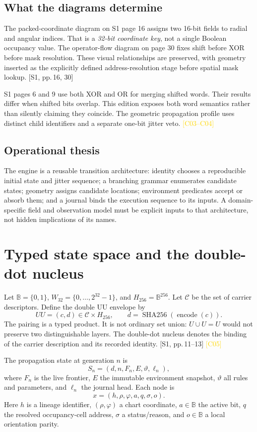 \documentclass[11pt,a4paper]{article}
\newcommand{\src}[2]{\textcolor{muted}{[#1, #2]}}
\newcommand{\corr}[1]{\textcolor{gold}{\textsf{[#1]}}}
\newcommand{\ph}{\varphi}
\newcommand{\sha}{\operatorname{SHA256}}
\newcommand{\B}{\mathbb B}
\begin{document}
\subsection{What the diagrams determine}
The packed-coordinate diagram on S1 page 16 assigns two 16-bit fields to radial and angular indices. That is a \emph{32-bit coordinate key}, not a single Boolean occupancy value. The operator-flow diagram on page 30 fixes shift before XOR before mask resolution. These visual relationships are preserved, with geometry inserted as the explicitly defined address-resolution stage before spatial mask lookup. \src{S1}{pp.\,16, 30}

S1 pages 6 and 9 use both XOR and OR for merging shifted words. Their results differ when shifted bits overlap. This edition exposes both word semantics rather than silently claiming they coincide. The geometric propagation profile uses distinct child identifiers and a separate one-bit jitter veto. \corr{C03--C04}

\subsection{Operational thesis}
The engine is a reusable transition architecture: identity chooses a reproducible initial state and jitter sequence; a branching grammar enumerates candidate states; geometry assigns candidate locations; environment predicates accept or absorb them; and a journal binds the execution sequence to its inputs. A domain-specific field and observation model must be explicit inputs to that architecture, not hidden implications of its names.
\clearpage

\section{Typed state space and the double-dot nucleus}
Let $\B=\{0,1\}$, $W_{32}=\{0,\ldots,2^{32}-1\}$, and $H_{256}=\B^{256}$. Let $\mathcal C$ be the set of carrier descriptors. Define the double UU envelope by
\begin{equation}
 U\!U=(c,d)\in\mathcal C\times H_{256},\qquad
 d=\sha(\operatorname{encode}(c)).
\end{equation}
The pairing is a typed product. It is not ordinary set union: $U\cup U=U$ would not preserve two distinguishable layers. The double-dot nucleus denotes the binding of the carrier description and its recorded identity. \src{S1}{pp.\,11--13} \corr{C05}

The propagation state at generation $n$ is
\begin{equation}
 S_n=(d,n,F_n,E,\vartheta,\ell_n),
\end{equation}
where $F_n$ is the live frontier, $E$ the immutable environment snapshot, $\vartheta$ all rules and parameters, and $\ell_n$ the journal head. Each node is
\begin{equation}
 x=(h,\rho,\ph,a,q,\sigma,o).
\end{equation}
Here $h$ is a lineage identifier, $(\rho,\ph)$ a chart coordinate, $a\in\B$ the active bit, $q$ the resolved occupancy-cell address, $\sigma$ a status/reason, and $o\in\B$ a local orientation parity.
\end{document}
